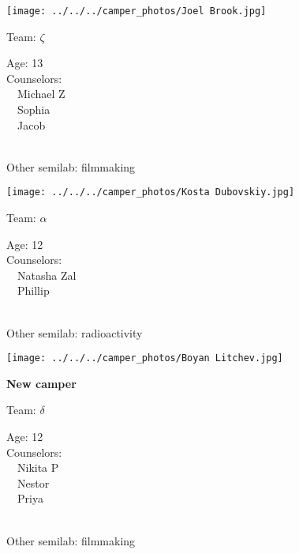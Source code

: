 \documentclass[10pt,letterpaper, landscape]{article}
\begin{document}
\horizontalshiftfornextsticker
\renewcommand{\baselinestretch}{1} \begin{sticker}
\noindent\begin{minipage}{0.5\textwidth}\texttt{[image: ../../../camper\_photos/Joel Brook.jpg]}\end{minipage}\begin{minipage}{0.45\textwidth}
Team: {\Large $\zeta$}

Age:        13\\
Counselors: \\\ \ Michael Z\\\ \ Sophia\\\ \ Jacob\\
\end{minipage} \\ \vspace{0.07in}
Other semilab: filmmaking
\end{sticker}
\horizontalshiftfornextsticker
\renewcommand{\baselinestretch}{1} \begin{sticker}
\noindent\begin{minipage}{0.5\textwidth}\texttt{[image: ../../../camper\_photos/Kosta Dubovskiy.jpg]}\end{minipage}\begin{minipage}{0.45\textwidth}
Team: {\Large $\alpha$}

Age:        12\\
Counselors: \\\ \ Natasha Zal\\\ \ Phillip\\
\end{minipage} \\ \vspace{0.07in}
Other semilab: radioactivity
\end{sticker}
\horizontalshiftfornextsticker
\renewcommand{\baselinestretch}{1} \begin{sticker}
\noindent\begin{minipage}{0.5\textwidth}\texttt{[image: ../../../camper\_photos/Boyan Litchev.jpg]}\end{minipage}\begin{minipage}{0.45\textwidth}
\textbf{New camper} 

Team: {\Large $\delta$}

Age:        12\\
Counselors: \\\ \ Nikita P\\\ \ Nestor\\\ \ Priya\\
\end{minipage} \\ \vspace{0.07in}
Other semilab: filmmaking
\end{sticker}
\end{document}
